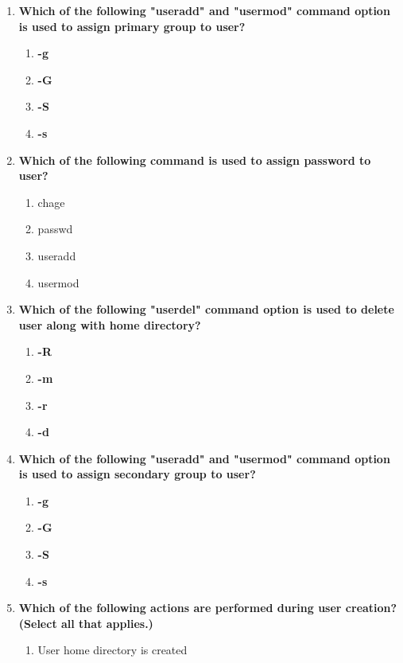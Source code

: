 \begin{flushleft}
	\begin{enumerate}
		\item \textbf{Which of the following "useradd" and "usermod" command option is used to assign primary group to user?}
		\begin{enumerate}[label=(\alph*)]
			\item \textbf{-g}   %
			\item \textbf{-G}
			\item \textbf{-S}
			\item \textbf{-s}
		\end{enumerate}
		\bigskip
		\bigskip
		\item \textbf{Which of the following command is used to assign password to user?}
		\begin{enumerate}[label=(\alph*)]
			\item chage  
			\item passwd %
			\item useradd
			\item usermod
		\end{enumerate}
		\bigskip
		\bigskip
		\item \textbf{Which of the following "userdel" command option is used to delete user along with home directory?}
		\begin{enumerate}[label=(\alph*)]
			\item \textbf{-R}
			\item \textbf{-m}  
			\item \textbf{-r}  %
			\item \textbf{-d}
		\end{enumerate}
		\bigskip
		\bigskip
		\item \textbf{Which of the following "useradd" and "usermod" command option is used to assign secondary group to user?}
		\begin{enumerate}[label=(\alph*)]
			\item \textbf{-g}
			\item \textbf{-G}    %
			\item \textbf{-S}
			\item \textbf{-s}
		\end{enumerate}
		\bigskip
		\bigskip
		\item \textbf{Which of the following actions are performed during user creation? (Select all that applies.)}
		\begin{enumerate}[label=(\alph*)]
			\item User home directory is created    %

\end{enumerate}
\end{enumerate}
\end{flushleft}
